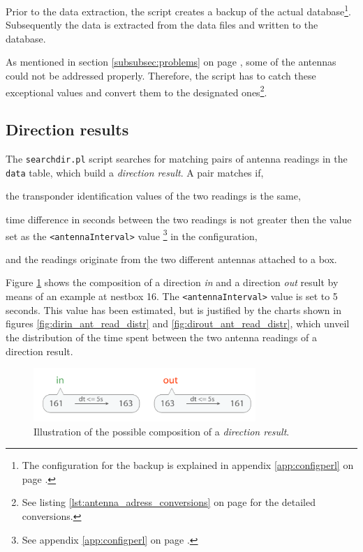 Prior to the data extraction, the  script creates a backup of the actual database\footnote{The configuration for the backup is explained in appendix \ref{app:configperl} on page \pageref{app:configperl}.}. Subsequently the data is extracted from the data files and written to the database. 

As mentioned in section \ref{subsubsec:problems} on page \pageref{subsubsec:problems}, some of the antennas could not be addressed properly. Therefore, the script has to catch these exceptional values and convert them to the designated ones\footnote{See listing \ref{lst:antenna_adress_conversions} on page \pageref{lst:antenna_adress_conversions} for the detailed conversions.}.  

\subsection{Direction results}
\label{subsec:dirres}

The \lstinline|searchdir.pl| script searches for matching pairs of antenna readings in the \lstinline|data| table, which build a \textit{direction result}. A pair matches if,

\begin{mylist}
\item the transponder identification values of the two readings is the same,
\item time difference in seconds between the two readings is not greater then the value set as the \lstinline|<antennaInterval>| value \footnote{See appendix \ref{app:configperl} on page \pageref{app:configperl}.} in the configuration, 
\item and the readings originate from the two different antennas attached to a box.  
\end{mylist}

Figure \ref{fig:direction_result} shows the composition of a direction \textit{in} and a direction \textit{out} result by means of an example at nestbox 16. The \lstinline|<antennaInterval>| value is set to 5 seconds. This value has been estimated, but is justified by the charts shown in figures \ref{fig:dirin_ant_read_distr} and \ref{fig:dirout_ant_read_distr}, which unveil the distribution of the time spent between the two antenna readings of a direction result.

\begin{figure}[htpb]
\begin{center}
  \includegraphics[width=0.75\textwidth]{assets/pdf/direction_result_schema.pdf}
  \caption[Illustration of a direction result]{Illustration of the possible composition of a \textit{direction result}.}
  \label{fig:direction_result}
\end{center}
\end{figure}

